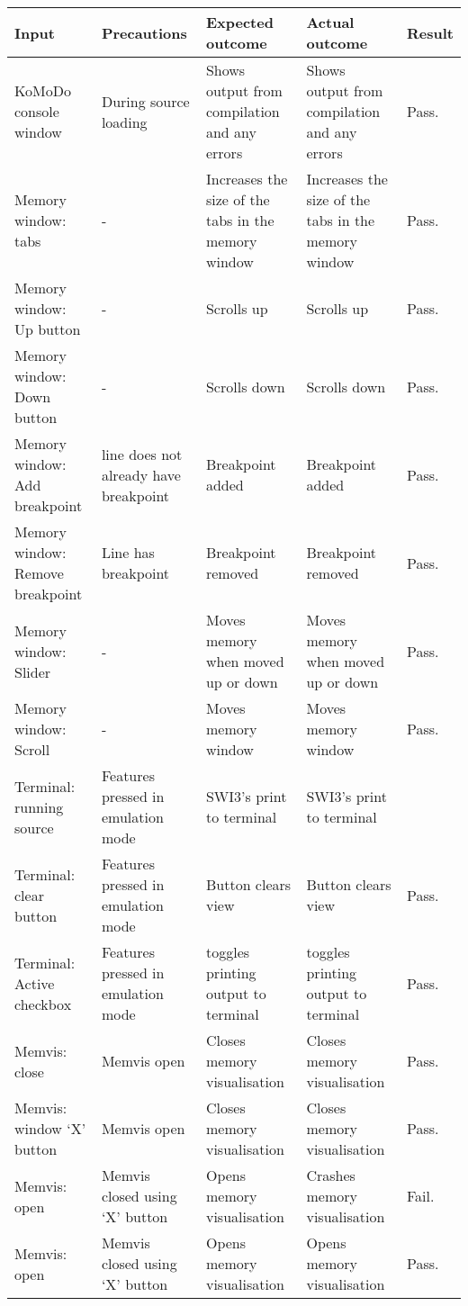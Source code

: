 \begin{landscape}
\begin{center}
\begin{tabular}{ | @{\makebox[2em][c]{\rownumber\space}} | p{4cm} |  p{5cm} | p{5cm} | p{5cm} | l |}
      \hline
      Input & Precautions & Expected outcome & Actual outcome & Result \\ \hline
      KoMoDo console window & During source loading & Shows output from compilation and any errors & Shows output from compilation and any errors & Pass. \\ \hline
      Memory window: tabs & - & Increases the size of the tabs in the memory window & Increases the size of the tabs in the memory window & Pass. \\ \hline
      Memory window: Up button & - & Scrolls up & Scrolls up & Pass. \\ \hline
      Memory window: Down button & - & Scrolls down & Scrolls down & Pass. \\ \hline
      Memory window: Add breakpoint & line does not already have breakpoint & Breakpoint added & Breakpoint added & Pass.\\ \hline
      Memory window: Remove breakpoint & Line has breakpoint & Breakpoint removed & Breakpoint removed & Pass.\\ \hline
      Memory window: Slider & - & Moves memory when moved up or down & Moves memory when moved up or down & Pass.\\ \hline
      Memory window: Scroll & - & Moves memory window & Moves memory window & Pass.\\ \hline
      Terminal: running source & Features pressed in emulation mode & SWI3's print to terminal & SWI3's print to terminal & \\ \hline
      Terminal: clear button & Features pressed in emulation mode & Button clears view & Button clears view & Pass.\\ \hline
      Terminal: Active checkbox & Features pressed in emulation mode & toggles printing output to terminal & toggles printing output to terminal & Pass.\\ \hline
      Memvis: close & Memvis open & Closes memory visualisation & Closes memory visualisation & Pass.\\ \hline
			Memvis: window `X' button & Memvis open & Closes memory visualisation & Closes memory visualisation & Pass.\\ \hline
			Memvis: open & Memvis closed using `X' button & Opens memory visualisation & Crashes memory visualisation & Fail.\\ \hline
			Memvis: open & Memvis closed using `X' button & Opens memory visualisation & Opens memory visualisation & Pass.\\ \hline

\end{tabular}
\end{center}
\end{landscape}
